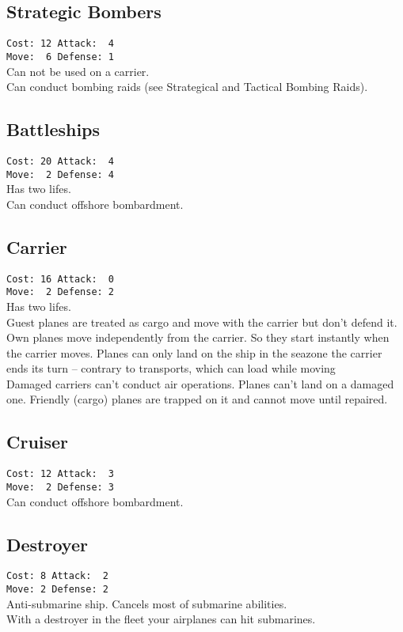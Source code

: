 \documentclass[10pt,twoside]{article}
\begin{document}
\begin{multicols*}{3}
\subsection*{Strategic Bombers}
\texttt{Cost: 12 \quad\quad\quad Attack: ~4 \\ Move: ~6 \quad\quad\quad Defense: 1 \\ }
Can not be used on a carrier.\\
Can conduct bombing raids (see \glqq Strategical and Tactical Bombing Raids\grqq).


\subsection*{Battleships}
\texttt{Cost: 20 \quad\quad\quad Attack: ~4 \\ Move: ~2 \quad\quad\quad Defense: 4 \\ }
Has two lifes.\\
Can conduct offshore bombardment.

\subsection*{Carrier}
\texttt{Cost: 16 \quad\quad\quad Attack: ~0 \\ Move: ~2 \quad\quad\quad Defense: 2 \\ }
Has two lifes.\\
Guest planes are treated as cargo and move with the carrier but don't defend it. Own planes move independently from the carrier. So they start instantly when the carrier moves. Planes can only land on the ship in the seazone the carrier ends its turn -- contrary to transports, which can load while moving\\
Damaged carriers can't conduct air operations. Planes can't land on a damaged one. Friendly (cargo) planes are trapped on it and cannot move until repaired.

\subsection*{Cruiser}
\texttt{Cost: 12 \quad\quad\quad Attack: ~3 \\ Move: ~2 \quad\quad\quad Defense: 3 \\ }
Can conduct offshore bombardment.

\subsection*{Destroyer}
\texttt{Cost: 8 \quad\quad\quad Attack: ~2 \\ Move: 2 \quad\quad\quad Defense: 2 \\ }
Anti-submarine ship. Cancels most of submarine abilities.\\
With a destroyer in the fleet your airplanes can hit submarines.


\end{multicols*}
\end{document}
